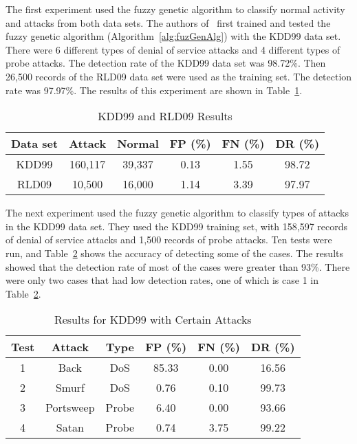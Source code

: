 \documentclass{sig-alternate}
\begin{document}
The first experiment used the fuzzy genetic algorithm to classify normal activity and attacks from both data sets. The authors of~\cite{6496342, 6559603} first trained and tested the fuzzy genetic algorithm (Algorithm~\ref{alg:fuzGenAlg}) with the KDD99 data set. There were 6 different types of denial of service attacks and 4 different types of probe attacks. The detection rate of the KDD99 data set was 98.72\%. Then 26,500 records of the RLD09 data set were used as the training set. The detection rate was 97.97\%. The results of this experiment are shown in Table~\ref{tab:bothSetsResults}.

\begin{table}
\caption{KDD99 and RLD09 Results}
\vspace{0.20cm}
\begin{tabular}{cccccc}
Data set & Attack & Normal & FP (\%) & FN (\%) & DR (\%)\\ \hline
KDD99 & 160,117 & 39,337 & 0.13 & 1.55 & 98.72\\
RLD09 & 10,500 & 16,000 & 1.14 & 3.39 & 97.97\\
\end{tabular}
\label{tab:bothSetsResults}
\end{table}

The next experiment used the fuzzy genetic algorithm to classify types of attacks in the KDD99 data set. They used the KDD99 training set, with 158,597 records of denial of service attacks and 1,500 records of probe attacks. Ten tests were run, and Table~\ref{tab:kddAttacks} shows the accuracy of detecting some of the cases. The results showed that the detection rate of most of the cases were greater than 93\%. There were only two cases that had low detection rates, one of which is case 1 in Table~\ref{tab:kddAttacks}.

\begin{table}
\caption{Results for KDD99 with Certain Attacks}
\vspace{0.20cm}
\begin{tabular}{cccccc}
Test & Attack & Type & FP (\%) & FN (\%) & DR (\%)\\ \hline
1 & Back & DoS & 85.33 & 0.00 & 16.56\\
2 & Smurf & DoS & 0.76 & 0.10 & 99.73\\
3 & Portsweep & Probe & 6.40 & 0.00 & 93.66\\
4 & Satan & Probe & 0.74 & 3.75 & 99.22\\
\end{tabular}
\label{tab:kddAttacks}
\end{table}
\end{document}
